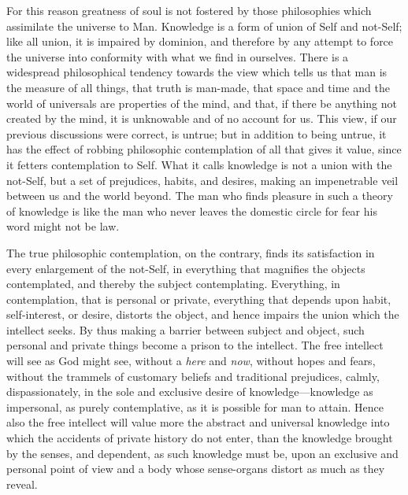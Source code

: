 For this reason greatness of soul is not fostered by those
philosophies which assimilate the universe to Man. Knowledge is a form
of union of Self and not-Self; like all union, it is impaired by
dominion, and therefore by any attempt to force the universe into
conformity with what we find in ourselves. There is a widespread
philosophical tendency towards the view which tells  us that
man is the measure of all things, that truth is man-made, that space
and time and the world of universals are properties of the mind, and
that, if there be anything not created by the mind, it is unknowable
and of no account for us. This view, if our previous discussions were
correct, is untrue; but in addition to being untrue, it has the effect
of robbing philosophic contemplation of all that gives it value, since
it fetters contemplation to Self. What it calls knowledge is not a
union with the not-Self, but a set of prejudices, habits, and desires,
making an impenetrable veil between us and the world beyond. The man
who finds pleasure in such a theory of knowledge is like the man who
never leaves the domestic circle for fear his word might not be law.

The true philosophic contemplation, on the contrary, finds its
satisfaction in every enlargement of the not-Self, in everything that
magnifies the objects contemplated, and thereby the subject
contemplating. Everything, in contemplation, that is personal or
private, everything that depends upon habit,  self-interest,
or desire, distorts the object, and hence impairs the union which the
intellect seeks. By thus making a barrier between subject and object,
such personal and private things become a prison to the intellect. The
free intellect will see as God might see, without a \textit{here} and
\textit{now}, without hopes and fears, without the trammels of
customary beliefs and traditional prejudices, calmly, dispassionately,
in the sole and exclusive desire of knowl\-edge---knowledge as
impersonal, as purely contemplative, as it is possible for man to
attain. Hence also the free intellect will value more the abstract and
universal knowledge into which the accidents of private history do not
enter, than the knowledge brought by the senses, and dependent, as
such knowledge must be, upon an exclusive and personal point of view
and a body whose sense-organs distort as much as they reveal.

